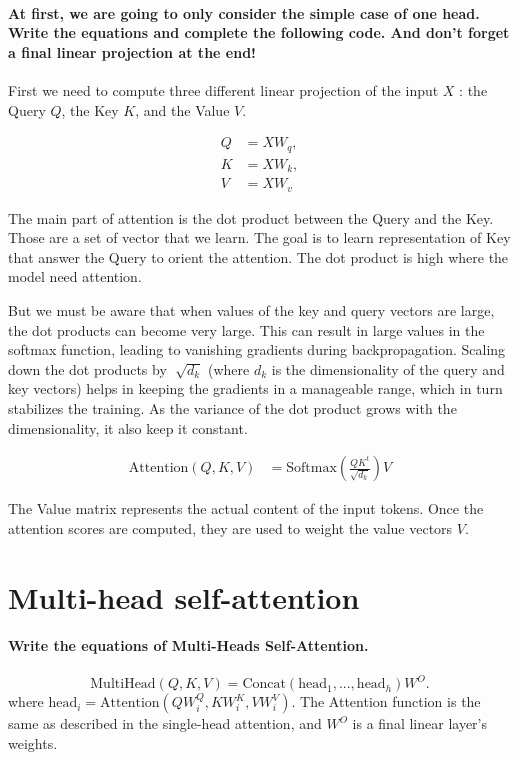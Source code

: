 \paragraph{At first, we are going to only consider the simple case of one head. Write the equations and complete the following code. And don't forget a final linear projection at the end!}

First we need to compute three different linear projection of the input $ X $ : the Query $ Q $, the Key $ K $, and the Value $ V $.

\begin{align*}
    Q & = X W_q, \\
    K & = X W_k, \\
    V & = X W_v
\end{align*}

The main part of attention is the dot product between the Query and the Key. Those are a set of vector that we learn. The goal is to learn representation of Key that answer the Query to orient the attention. The dot product is high where the model need attention.

But we must be aware that when values of the key and query vectors are large, the dot products can become very large. This can result in large values in the softmax function, leading to vanishing gradients during backpropagation. Scaling down the dot products by $ \sqrt[]{d_k} $ (where $ d_k $  is the dimensionality of the query and key vectors) helps in keeping the gradients in a manageable range, which in turn stabilizes the training. As the variance of the dot product grows with the dimensionality, it also keep it constant.

\begin{align*}
    \text{Attention}(Q, K, V) & = \text{Softmax}\left(\frac{QK^t}{\sqrt{d_k}}\right)V
\end{align*}

The Value matrix represents the actual content of the input tokens. Once the attention scores are computed, they are used to weight the value vectors $ V $.

\section{Multi-head self-attention}

\paragraph{Write the equations of Multi-Heads Self-Attention.}
\[
    \text{MultiHead}(Q, K, V) = \text{Concat}(\text{head}_1, ..., \text{head}_h)W^O
    .\]
where $\text{head}_i = \text{Attention}(QW_i^Q, KW_i^K, VW_i^V)$. The Attention function is the same as described in the single-head attention, and $W^O$ is a final linear layer's weights.

